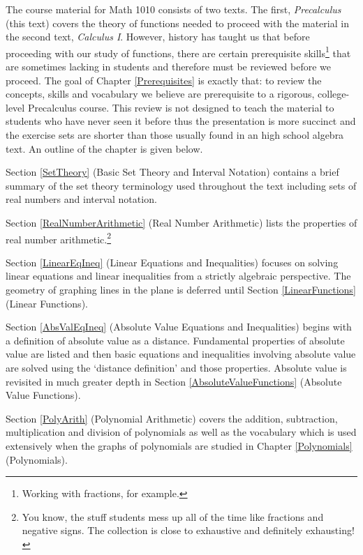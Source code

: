 The course material for Math 1010 consists of two texts. The first, \textit{Precalculus} (this text) covers the theory of functions needed to proceed with the material in the second text, \textit{Calculus I}. However, history has taught us that before proceeding with our study of functions, there are certain prerequisite skills\footnote{Working with fractions, for example.} that are sometimes lacking in students and therefore must be reviewed before we proceed.  The goal of Chapter \ref{Prerequisites} is exactly that: to review the concepts, skills and vocabulary we believe are prerequisite to a rigorous, college-level Precalculus course.  This review is not designed to teach the material to students who have never seen it before thus the presentation is more succinct and the exercise sets are shorter than those usually found in an high school algebra text.  An outline of the chapter is given below.

\smallskip

Section \ref{SetTheory} (Basic Set Theory and Interval Notation) contains a brief summary of the set theory terminology used throughout the text including sets of real numbers and interval notation.

\smallskip

Section \ref{RealNumberArithmetic} (Real Number Arithmetic) lists the properties of real number arithmetic.\footnote{You know, the stuff students mess up all of the time like fractions and negative signs.  The collection is close to exhaustive and definitely exhausting!}

\smallskip

Section \ref{LinearEqIneq} (Linear Equations and Inequalities) focuses on solving linear equations and linear inequalities from a strictly algebraic perspective.  The geometry of graphing lines in the plane is deferred until Section \ref{LinearFunctions} (Linear Functions).

\smallskip

Section \ref{AbsValEqIneq} (Absolute Value Equations and Inequalities) begins with a definition of absolute value as a distance.  Fundamental properties of absolute value are listed and then basic equations and inequalities involving absolute value are solved using the `distance definition' and those properties.  Absolute value is revisited in much greater depth in Section \ref{AbsoluteValueFunctions} (Absolute Value Functions).

\smallskip

Section \ref{PolyArith} (Polynomial Arithmetic) covers the addition, subtraction, multiplication and division of polynomials as well as the vocabulary which is used extensively when the graphs of polynomials are studied in Chapter \ref{Polynomials} (Polynomials).

